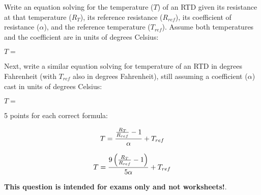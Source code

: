 

Write an equation solving for the temperature ($T$) of an RTD given its resistance at that temperature ($R_T$), its reference resistance ($R_{ref}$), its coefficient of resistance ($\alpha$), and the reference temperature ($T_{ref}$).  Assume both temperatures and the coefficient are in units of degrees Celsius:

\vskip 10pt

$T =$ 

\vskip 20pt

Next, write a similar equation solving for temperature of an RTD in degrees Fahrenheit (with $T_{ref}$ also in degrees Fahrenheit), still assuming a coefficient ($\alpha$) cast in units of degrees Celsius:

\vskip 10pt

$T =$ 







5 points for each correct formula:

$$T = {{R_T \over R_{ref}} - 1 \over \alpha} + T_{ref}$$

$$T = { 9 \left( {R_T \over R_{ref}} - 1 \right) \over 5 \alpha} + T_{ref}$$







{\bf This question is intended for exams only and not worksheets!}.


